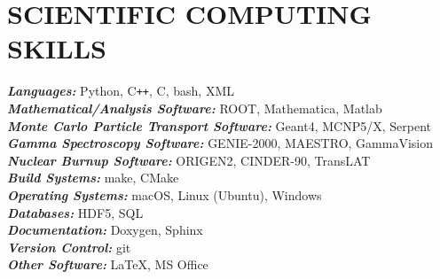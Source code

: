 \section{\small{SCIENTIFIC COMPUTING \\ SKILLS}}

{\sl\bf Languages:} \hfill Python, C\verb!++!, C, bash, XML\\
{\sl\bf Mathematical/Analysis Software:} \hfill ROOT, Mathematica, Matlab\\ 
{\sl\bf Monte Carlo Particle Transport Software:} \hfill Geant4, MCNP5/X, Serpent\\
{\sl\bf Gamma Spectroscopy Software:} \hfill GENIE-2000, MAESTRO, GammaVision\\
{\sl\bf Nuclear Burnup Software:} \hfill ORIGEN2, CINDER-90, TransLAT\\
{\sl\bf Build Systems:} \hfill make, CMake\\
{\sl\bf Operating Systems:} \hfill macOS, Linux (Ubuntu), Windows\\
{\sl\bf Databases:} \hfill HDF5, SQL\\
{\sl\bf Documentation:} \hfill Doxygen, Sphinx\\
{\sl\bf Version Control:} \hfill git\\
{\sl\bf Other Software:} \hfill \LaTeX, MS Office

%